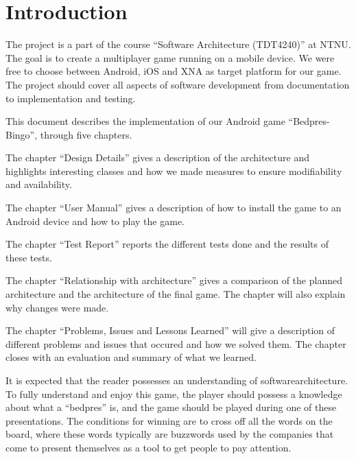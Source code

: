 \section{Introduction}
\label{sec:introduction}

The project is a part of the course ``Software Architecture (TDT4240)'' at
NTNU\@. The goal is to create a multiplayer game running on a mobile device. We were free to choose between Android, iOS and XNA as target platform for our game. The project should cover all aspects of software development from documentation to implementation and testing.

This document describes the implementation of our Android game
``Bedpres-Bingo'', through five chapters.

The chapter ``Design Details'' gives a description of the architecture and highlights interesting classes and how we made measures to ensure modifiability and availability.

The chapter ``User Manual'' gives a description of how to install the game to an Android device and how to play the game.

The chapter ``Test Report'' reports the different tests done and the results of these tests. 

The chapter ``Relationship with architecture'' gives a comparison of the planned architecture and the architecture of the final game. The chapter will also explain why changes were made.

The chapter ``Problems, Issues and Lessons Learned'' will give a description of different problems and issues that occured and how we solved them. The chapter closes with an evaluation and summary of what we learned. 

It is expected that the reader possesses an understanding of softwarearchitecture. To fully understand and enjoy this game, the player should possess a knowledge about what a ``bedpres'' is, and the game should be played during one of these presentations. The conditions for winning are to cross off all the words on the board, where these words typically are buzzwords used by the companies that come to present themselves as a tool to get people to pay attention.
